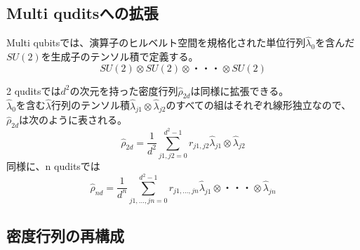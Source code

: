 \documentclass[11pt,a4j,notitlepage]{jreport}
\begin{document}
	\subsection{Multi quditsへの拡張}

	Multi qubitsでは、演算子のヒルベルト空間を規格化された単位行列$\hat{\lambda}_0$を含んだ$SU(2)$を生成子のテンソル積で定義する。
	\begin{equation}
		SU(2) \otimes SU(2) \otimes ・・・ \otimes SU(2)
	\end{equation}

	2 quditsでは$d^2$の次元を持った密度行列$\hat{\rho}_{2 d}$は同様に拡張できる。\\
	$\hat{\lambda}_0$を含む$\hat{\lambda}$行列のテンソル積$\hat{\lambda}_{j 1} \otimes \hat{\lambda}_{j 2}$のすべての組はそれぞれ線形独立なので、$\hat{\rho}_{2 d}$は次のように表される。
	\begin{equation}
		\hat{\rho}_{2 d} = \frac{1}{d^2} \sum_{j1,j2=0}^{d^2 - 1} r_{j 1, j 2} \hat{\lambda}_{j 1} \otimes \hat{\lambda}_{j 2}
	\end{equation}
	同様に、n quditsでは
	\begin{equation}
		\hat{\rho}_{n d} = \frac{1}{d^n} \sum_{j1,...,jn=0}^{d^2 - 1} r_{j 1,...,j n} \hat{\lambda}_{j 1} \otimes ・・・ \otimes \hat{\lambda}_{j n}
	\end{equation}

	\subsection{密度行列の再構成}
\end{document}
